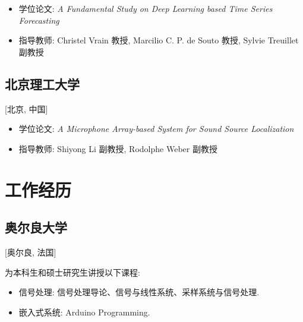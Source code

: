 \documentclass{mycv}
\begin{document}
\begin{itemize}
  \itemsep 0.4em
  \item 学位论文: \textit{A Fundamental Study on Deep Learning based Time Series Forecasting}
  \item 指导教师: Christel Vrain 教授, Marcilio C. P. de Souto 教授, Sylvie Treuillet 副教授
\end{itemize}

\vspace{-\parskip}

\subsection{\large 北京理工大学}[北京, 中国]

\begin{positions}
\end{positions}

\begin{itemize}
  \itemsep 0.4em
  \item 学位论文: \textit{A Microphone Array-based System for Sound Source Localization}
  \item 指导教师: Shiyong Li 副教授, Rodolphe Weber 副教授
\end{itemize}

\vspace{-1em}

\section{工作经历}

\subsection{\large 奥尔良大学}[奥尔良, 法国]

\begin{positions}
\end{positions}

为本科生和硕士研究生讲授以下课程:

\begin{itemize}
  \itemsep 0.4em
  \item 信号处理: 信号处理导论、信号与线性系统、采样系统与信号处理.
  \item 嵌入式系统: Arduino Programming.
\end{itemize}

\vspace{-\parskip}
\end{document}
